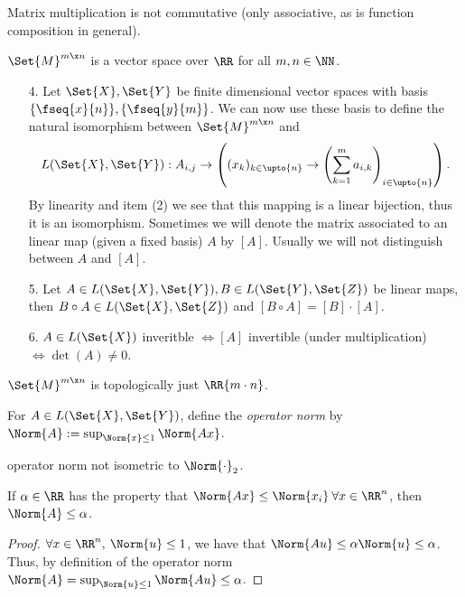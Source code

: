 \begin{rem}
 Matrix multiplication is not commutative (only associative, as is function composition in general).
\end{rem}
\begin{rem}
 $\Set{M}^{m\x n}$ is a vector space over $\RR$ for all $m,n\in\NN$.
\end{rem}
\begin{enumerate}
 \item[4.] Let $\Set{X}, \Set{Y}$ be finite dimensional vector spaces with basis $\{\fseq{x}{n}\}, \linebreak[4]\{\fseq{y}{m}\}$. We can now use these basis to define the natural isomorphism between $\Set{M}^{m\x n}$ and \[L(\Set{X},\Set{Y}): A_{i,j}\to \left((x_k)_{k\in\upto{n}}\to \left(\sum_{k=1}^{m}a_{i,k}\right)_{i\in\upto{n}}\right).\] By linearity and item (2) we see that this mapping is a linear bijection, thus it is an isomorphism. 
 Sometimes we will denote the matrix associated to an linear map (given a fixed basis) $A$ by $[A]$. Usually we will not distinguish between $A$ and $[A]$. 
 \item[5.] Let $A\in L(\Set{X},\Set{Y}), B\in L(\Set{Y},\Set{Z})$ be linear maps, then $B\circ A\in L(\Set{X},\Set{Z})$ and $[B\circ A]=[B]\cdot[A]$.
 \item[6.] $A\in L(\Set{X})$ inveritble $\Leftrightarrow [A]$ invertible (under multiplication) $\Leftrightarrow\det(A)\neq 0$. 
\end{enumerate}
\begin{rem}
	$\Set{M}^{m\x n}$ is topologically just $\RR{m\cdot n}$. 
\end{rem}
\begin{defn}
 For $A\in L(\Set{X},\Set{Y})$, define the \emph{operator norm} by $\Norm{A}:=\sup_{\Norm{x}\leq 1}\Norm{A x}$.
\end{defn}
\begin{rem}
 operator norm not isometric to $\Norm{\cdot}_2$.
\end{rem}
\begin{lem}
 \label{lem:obvbndOpNorm}
 If $\alpha\in\RR$ has the property that $\Norm{A x}\leq \Norm{x_i}\:\forall x\in\RR^n$, then $\Norm{A}\leq \alpha$.
\end{lem}
\begin{proof}
 $\forall x\in\RR^n,\:\Norm{u}\leq 1$, we have that $\Norm{Au}\leq \alpha\Norm{u}\leq\alpha$. Thus, by definition of the operator norm $\Norm{A}=\sup_{\Norm{u}\leq 1}\Norm{Au}\leq \alpha$.
\end{proof}
